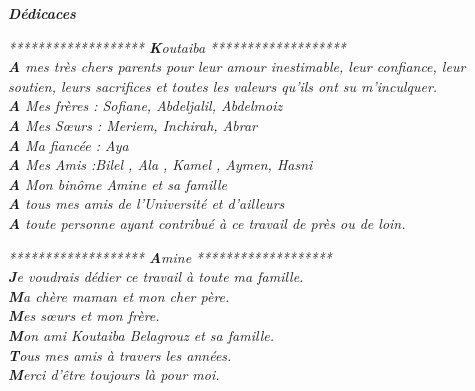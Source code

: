 \newpage
\thispagestyle{empty}
\begin{center}
\textcolor[rgb]{0,0,1}{{\Huge\textbf{\textit{Dédicaces}}}}
\end{center}

\vspace{1 cm}

\begin{center}
\textcolor[rgb]{0,0,1}{\textit{******************* \hspace{0.5 cm}\LARGE{\textbf{K}outaiba}} \hspace{0.5 cm}  \textit{*******************}}\\
\textit{\textbf{A} mes très chers parents pour leur amour inestimable, leur confiance, leur soutien, leurs sacrifices et toutes les valeurs qu'ils ont su m'inculquer. }\\
\textit{\textbf{A} Mes frères : Sofiane, Abdeljalil, Abdelmoiz}\\
\textit{\textbf{A} Mes Sœurs : Meriem, Inchirah, Abrar}\\
\textit{\textbf{A} Ma fiancée : Aya }\\
\textit{\textbf{A} Mes Amis :Bilel , Ala , Kamel , Aymen, Hasni}\\
\textit{\textbf{A} Mon binôme Amine et sa famille }\\
\textit{\textbf{A} tous mes amis de l'Université et d'ailleurs }\\
\textit{\textbf{A} toute personne ayant contribué à ce travail de près ou de loin.}\\
\end{center}
\vspace{1 cm}

\begin{center}
\textcolor[rgb]{0,0,1}{\textit{******************* \hspace{0.5 cm}\LARGE{\textbf{A}mine}} \hspace{0.5 cm}  \textit{*******************}}\\
\textit{\textbf{J}e voudrais dédier ce travail à toute ma famille.}\\
\textit{\textbf{M}a chère maman et mon cher père.}\\
\textit{\textbf{M}es sœurs et mon frère.}\\
\textit{\textbf{M}on ami Koutaiba Belagrouz et sa famille.}\\
\textit{\textbf{T}ous mes amis à travers les années.}\\
\textit{\textbf{M}erci d’être toujours là pour moi.}\\

\end{center}




